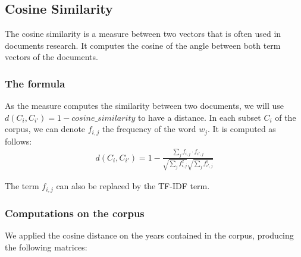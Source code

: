 \subsection{Cosine Similarity}

The cosine similarity is a measure between two vectors that is often used in documents research. It computes the cosine of the angle between both term vectors of the documents.

\subsubsection{The formula}

As the measure computes the similarity between two documents,  we will use $d(C_i,C_{i'}) = 1 - cosine\_ similarity$ to have a distance. In each subset $C_i$ of the corpus, we can denote $f_{i,j}$ the frequency of the word $w_j$. It is computed as follows:
\begin{eqnarray}
 d(C_i,C_{i'}) = 1 - \frac{\sum_j f_{i,j}\cdot f_{i',j}}{\sqrt{\sum_j f_{i,j}^2} \sqrt{\sum_j f_{i',j}^2 }}
\end{eqnarray}

The term $f_{i,j}$ can also be replaced by the TF-IDF term.

\subsubsection{Computations on the corpus}

We applied the cosine distance on the years contained in the corpus, producing the following matrices:

